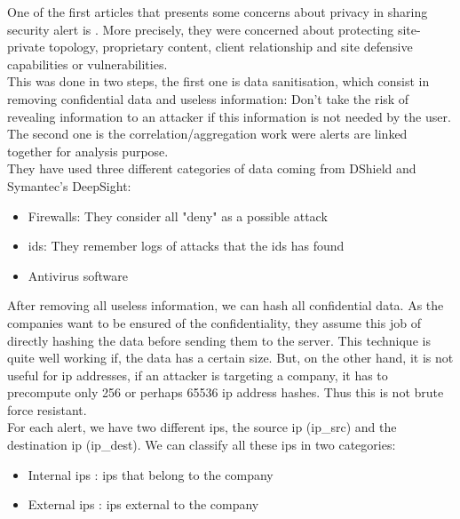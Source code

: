 \documentclass{eplmastersthesis}
\begin{document}
One of the first articles that presents some concerns about privacy in sharing security alert is \cite{lincoln2004privacy}.
More precisely, they were concerned about protecting site-private topology, proprietary content, client relationship and site defensive capabilities or vulnerabilities.\\
This was done in two steps, the first one is data sanitisation, which consist in removing confidential data and useless information: Don't take the risk of revealing information to an attacker if this information is not needed by the user.\\
The second one is the correlation/aggregation work were alerts are linked together for analysis purpose.\\
 They have used three different categories of data coming from DShield and Symantec's DeepSight:
\begin{itemize}
\item Firewalls: They consider all "deny" as a possible attack
\item \gls{ids}: They remember logs of attacks that the \gls{ids} has found
\item Antivirus software
\end{itemize}

After removing all useless information, we can hash all confidential data. As the companies want to be ensured of the confidentiality, they assume this job of directly hashing the data before sending them to the server.
This technique is quite well working if, the data has a certain size. But, on the other hand, it is not useful for \gls{ip} addresses, if an attacker is targeting a company, it has to precompute only 256 or perhaps 65536 \gls{ip} address hashes. Thus this is not brute force resistant.\\
For each alert, we have two different \gls{ip}s, the source \gls{ip} (ip\_src) and the destination \gls{ip} (ip\_dest). We can classify all these \gls{ip}s in two categories:
\begin{itemize}
	\item Internal \gls{ip}s : \gls{ip}s that belong to the company
	\item External \gls{ip}s : \gls{ip}s external to the company
\end{itemize}
\end{document}
